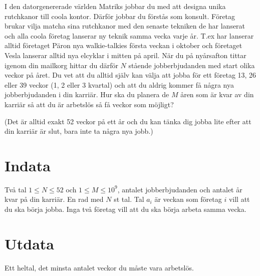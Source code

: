 I den datorgenererade världen Matriks jobbar du med att designa unika rutchkanor till coola kontor. Därför jobbar du förstås som konsult. 
Företag brukar vilja matcha sina rutchkanor med den senaste tekniken de har lanserat och alla coola företag lanserar ny teknik samma vecka varje år. T.ex har lanserar alltid företaget Päron nya walkie-talkies första veckan i oktober och företaget Vesla lanserar alltid nya elcyklar i mitten på april.
När du på nyårsafton tittar igenom din mailkorg hittar du därför $N$ stående jobberbjudanden med start olika veckor på året. Du vet att du alltid själv kan välja att jobba för ett företag 13, 26 eller 39 veckor (1, 2 eller 3 kvartal) och att du aldrig kommer få några nya jobberbjudanden i din karriär. 
Hur ska du planera de $M$ åren som är kvar av din karriär så att du är arbetslös så få veckor som möjligt?

(Det är alltid exakt 52 veckor på ett år och du kan tänka dig jobba lite efter att din karriär är slut, bara inte ta några nya jobb.)

\section*{Indata}
Två tal $1 \leq N \leq 52$ och $1 \leq M \leq 10^9$, antalet jobberbjudanden och antalet år kvar på din karriär. 
En rad med $N$ st tal. Tal $a_i$ är veckan som företag $i$ vill att du ska börja jobba. Inga två företag vill att du ska börja arbeta samma vecka.

\section*{Utdata}
Ett heltal, det minsta antalet veckor du måste vara arbetslös. 
